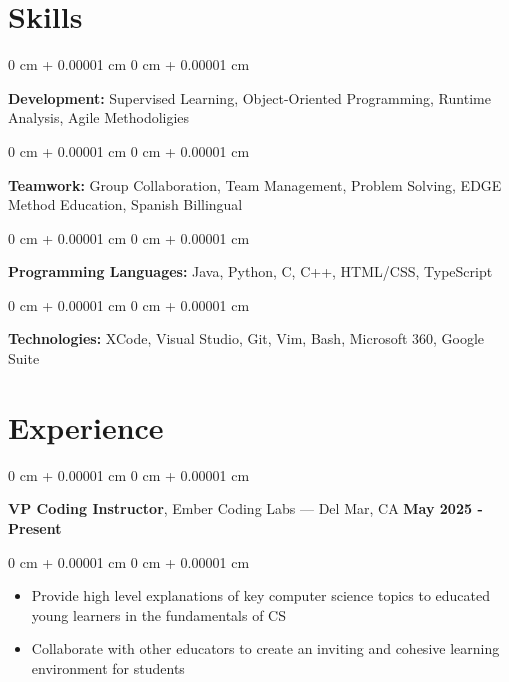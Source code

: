 \documentclass[10pt, letterpaper]{article}
\newenvironment{highlights}{
    \begin{itemize}[
        topsep=0.10 cm,
        parsep=0.10 cm,
        partopsep=0pt,
        itemsep=0pt,
        leftmargin=0 cm + 10pt
    ]
}{
    \end{itemize}
} %
\newenvironment{onecolentry}{
    \begin{adjustwidth}{
        0 cm + 0.00001 cm
    }{
        0 cm + 0.00001 cm
    }
}{
    \end{adjustwidth}
} %
\newenvironment{twocolentry}[2][]{
    \onecolentry%
    \def\secondColumn{#2}
    \setcolumnwidth{\fill, 6.0 cm}
    \begin{paracol}{2}
}{
    \switchcolumn\raggedleft\secondColumn%
    \end{paracol}
    \endonecolentry%
} %
\begin{document}
    
    
    {\color{secondaryColor}\section{Skills}}
        
        \begin{onecolentry}
            \textbf{Development:} Supervised Learning, Object-Oriented Programming, Runtime Analysis, Agile Methodoligies
        \end{onecolentry}

        \vspace{0.10 cm}

        \begin{onecolentry}
            \textbf{Teamwork:} Group Collaboration, Team Management, Problem Solving, EDGE Method Education, Spanish Billingual
        \end{onecolentry}

        \vspace{0.10 cm}
        
        \begin{onecolentry}
            \textbf{Programming Languages:} Java, Python, C, C++, HTML/CSS, TypeScript
        \end{onecolentry}

        \vspace{0.10 cm}
        
        \begin{onecolentry}
            \textbf{Technologies:} XCode, Visual Studio, Git, Vim, Bash, Microsoft 360, Google Suite
        \end{onecolentry}
    
    {\color{secondaryColor}\section{Experience}}


        
        \begin{twocolentry}{
            {\color{secondaryColor}\textbf{May 2025 - Present}}
        }
            \textbf{VP Coding Instructor}, Ember Coding Labs --- Del Mar, CA\end{twocolentry}

        \vspace{0.10 cm}
        \begin{onecolentry}
            \begin{highlights}
                \item Provide high level explanations of key computer science topics to educated young learners in the fundamentals of CS
                \item Collaborate with other educators to create an inviting and cohesive learning environment for students
            \end{highlights}
        \end{onecolentry}
\end{document}
